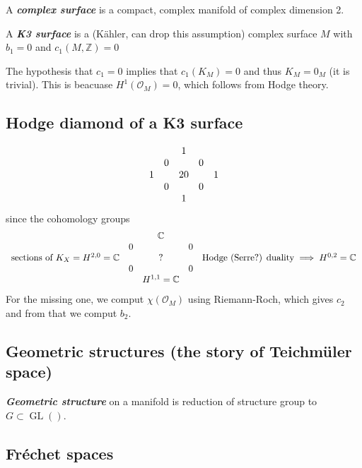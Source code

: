 \begin{defn}
	A \textit{\textbf{complex surface}} is a compact, complex manifold of complex dimension 2.
\end{defn}

\begin{defn}
	A \textit{\textbf{K3 surface}} is a (K\"ahler, can drop this assumption) complex surface $M$ with $b_1=0$ and $c_1(M,\mathbb{Z})=0$
\end{defn}

\begin{remark}
	The hypothesis that $c_1=0$ implies that $c_1(K_M)=0$ and thus $K_M=0_M$ (it is trivial). This is beacuase  $H^{1}(\mathcal{O}_M)=0$, which follows from Hodge theory.
\end{remark}

\subsection{Hodge diamond of a K3 surface}

\[\begin{array}{c c c c c }
	&&1\\
	&0&&0\\
	1&&20&&1\\
	&0&&0\\
	&&1
\end{array}\]
since the cohomology groups
\[\begin{array}{c c c c c }
	&&\mathbb{C}\\
	&0&&0\\
	\text{sections of }K_X= H^{2,0}=\mathbb{C}&&?&&\text{Hodge (Serre?) duality}\implies  H^{0,2}=\mathbb{C}\\
	&0&&0\\
	&&H^{1,1}=\mathbb{C}
\end{array}\]
For the missing one, we comput $\chi(\mathcal{O}_M)$ using Riemann-Roch, which gives $c_2$ and from that we comput $b_2$.

\subsection{Geometric structures (the story of Teichm\"uler space)}

\begin{defn}
	\textit{\textbf{Geometric structure}} on a manifold is reduction of structure group to  $G\subset \operatorname{GL}()$.
\end{defn}

\subsection{Fr\'echet spaces}


